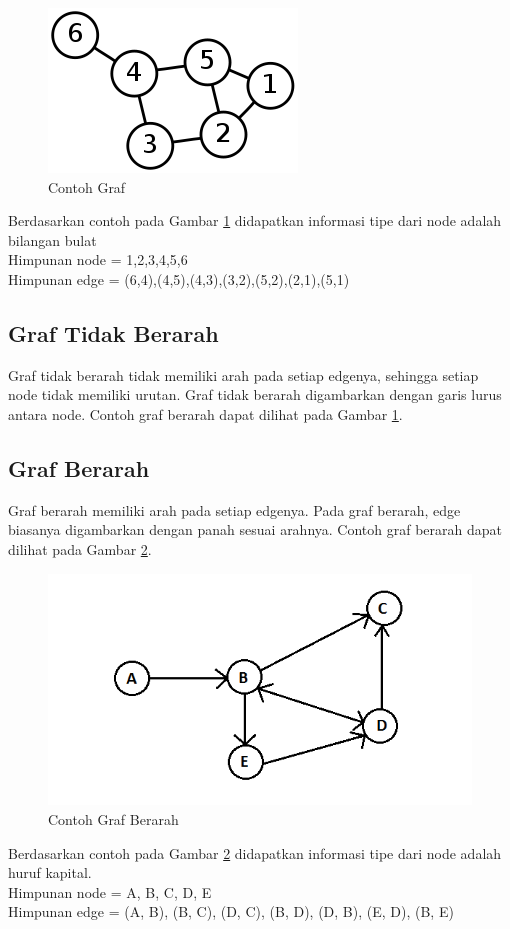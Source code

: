 \begin{figure}[h]
\centering
\includegraphics[scale=0.9]{Gambar/graph}
\caption[Contoh Graf]{Contoh Graf}
\label{fig:graph}
\end{figure}
Berdasarkan contoh pada Gambar \ref{fig:graph}  didapatkan informasi tipe dari
node adalah bilangan bulat \\
Himpunan node = {1,2,3,4,5,6} \\ 
Himpunan edge = {(6,4),(4,5),(4,3),(3,2),(5,2),(2,1),(5,1)}

\subsection{Graf Tidak Berarah}
Graf tidak berarah tidak memiliki arah pada setiap edgenya, sehingga setiap
node tidak memiliki urutan. Graf tidak berarah digambarkan dengan garis lurus
antara node. Contoh graf berarah dapat dilihat pada Gambar
\ref{fig:graph}.

\subsection{Graf Berarah}
Graf berarah memiliki arah pada setiap edgenya. Pada graf berarah, edge biasanya
digambarkan dengan panah sesuai arahnya. Contoh graf berarah dapat dilihat pada
Gambar \ref{fig:direc_graph}.
\begin{figure}[h]
\centering
\includegraphics[scale=1]{Gambar/direc_graph}
\caption[Contoh Graf Berarah]{Contoh Graf Berarah}
\label{fig:direc_graph}
\end{figure}
Berdasarkan contoh pada Gambar \ref{fig:direc_graph}  didapatkan informasi tipe
dari node adalah huruf kapital. \\
Himpunan node = {A, B, C, D, E} \\ 
Himpunan edge = {(A, B), (B, C), (D, C), (B, D), (D, B), (E, D), (B, E)}

